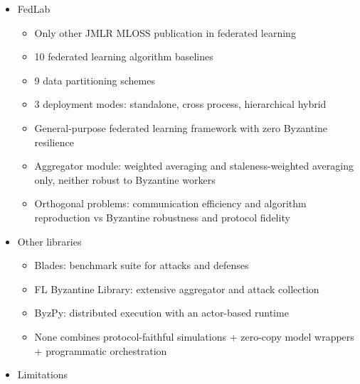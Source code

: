 \documentclass[twoside,11pt]{article}
\begin{document}
{\begin{itemize}
\begin{itemize}
        \begin{itemize}
            \item Researchers must manually edit config files to modify experiments
            \item Krum's orchestration accepts user-defined functions and standard Python loops
            \item Easy to integrate new aggregation rules or attacks without touching the orchestration layer
        \end{itemize}
        \item Trade-off: fewer aggregators (10 vs 12+4) for protocol fidelity + orchestration at scale (thousands of experiments)
    \end{itemize}
    \item FedLab
    \begin{itemize}
        \item Only other JMLR MLOSS publication in federated learning
        \item 10 federated learning algorithm baselines
        \item 9 data partitioning schemes
        \item 3 deployment modes: standalone, cross process, hierarchical hybrid
        \item General-purpose federated learning framework with zero Byzantine resilience
        \item Aggregator module: weighted averaging and staleness-weighted averaging only, neither robust to Byzantine workers
        \item Orthogonal problems: communication efficiency and algorithm reproduction vs Byzantine robustness and protocol fidelity
    \end{itemize}
    \item Other libraries
    \begin{itemize}
        \item Blades: benchmark suite for attacks and defenses
        \item FL Byzantine Library: extensive aggregator and attack collection
        \item ByzPy: distributed execution with an actor-based runtime
        \item None combines protocol-faithful simulations + zero-copy model wrappers + programmatic orchestration
    \end{itemize}
    \item Limitations
    \begin{itemize}

\end{itemize}
\end{itemize}}
\end{document}
